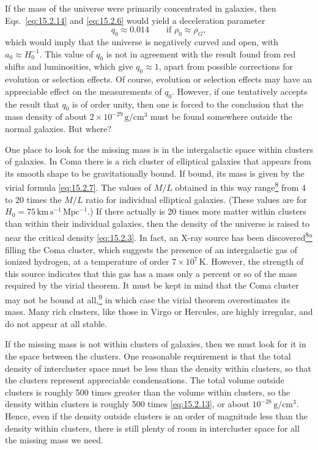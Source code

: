 If the mass of the universe were primarily concentrated in galaxies, then
Eqs.~\eqref{eq:15.2.14} and \eqref{eq:15.2.6} would yield a deceleration
parameter
\begin{equation}
  q_0\approx0.014
  \qquad\text{if }\rho_0\approx\rho_G,
  \tag{15.2.15}\label{eq:15.2.15}
\end{equation}
which would imply that the universe is negatively curved and open, with
\(a_0\approx H_0^{-1}\). This value of \(q_0\) is not in agreement with
the result found from red shifts and luminosities, which give \(q_0\approx1\),
apart from possible corrections for evolution or selection effects. Of course,
evolution or selection effects may have an appreciable effect on the
measurements of \(q_0\). However, if one tentatively accepts the result that
\(q_0\) is of order unity, then one is forced to the conclusion that the mass
density of about \(2\times10^{-29}\,\mathrm{g/cm^3}\) must be found
somewhere outside the normal galaxies. But where?

One place to look for the missing mass is in the intergalactic space within
clusters of galaxies. In Coma there is a rich cluster of elliptical galaxies
that appears from its smooth shape to be gravitationally bound. If bound, its
mass is given by the virial formula \eqref{eq:15.2.7}. The values of \(M/L\)
obtained in this way
range\hyperref[ch15-ref-8]{\textsuperscript{8}} from 4 to 20 times the
\(M/L\) ratio for individual elliptical galaxies. (These values are for
\(H_0=75\,\mathrm{km\,s^{-1}\,Mpc^{-1}}\).) If there actually is 20 times
more matter within clusters than within their individual galaxies, then the
density of the universe is raised to near the critical density
\eqref{eq:15.2.3}. In fact, an X-ray source has been
discovered\hyperref[ch15-ref-8a]{\textsuperscript{8a}} filling the Coma
cluster, which suggests the presence of an intergalactic gas of ionized
hydrogen, at a temperature of order \(7\times10^7\,\mathrm{K}\). However,
the strength of this source indicates that this gas has a mass only a percent or
so of the mass required by the virial theorem. It must be kept in mind that the
Coma cluster may not be bound at
all,\hyperref[ch15-ref-9]{\textsuperscript{9}} in which case the virial
theorem overestimates its mass. Many rich clusters, like those in Virgo or
Hercules, are highly irregular, and do not appear at all stable.

If the missing mass is not within clusters of galaxies, then we must look for it
in the space between the clusters. One reasonable requirement is that the total
density of intercluster space must be less than the density within clusters, so
that the clusters represent appreciable condensations. The total volume outside
clusters is roughly 500 times greater than the volume within clusters, so the
density within clusters is roughly 500 times \eqref{eq:15.2.13}, or about
\(10^{-28}\,\mathrm{g/cm^3}\). Hence, even if the density outside clusters
is an order of magnitude less than the density within clusters, there is still
plenty of room in intercluster space for all the missing mass we need.

